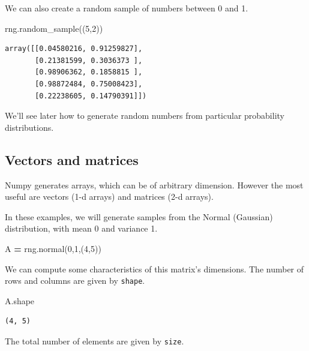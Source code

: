 \documentclass[
  letterpaper,
]{scrbook}
\newenvironment{Shaded}{\begin{snugshade}}{\end{snugshade}}
\newcommand{\DecValTok}[1]{\textcolor[rgb]{0.00,0.00,0.81}{#1}}
\newcommand{\NormalTok}[1]{#1}
\newcommand{\OperatorTok}[1]{\textcolor[rgb]{0.81,0.36,0.00}{\textbf{#1}}}
\begin{document}
We can also create a random sample of numbers between 0 and 1.

\begin{Shaded}
\begin{Highlighting}[]
\NormalTok{rng.random_sample((}\DecValTok{5}\NormalTok{,}\DecValTok{2}\NormalTok{))}
\end{Highlighting}
\end{Shaded}

\begin{verbatim}
array([[0.04580216, 0.91259827],
       [0.21381599, 0.3036373 ],
       [0.98906362, 0.1858815 ],
       [0.98872484, 0.75008423],
       [0.22238605, 0.14790391]])
\end{verbatim}

We'll see later how to generate random numbers from particular probability distributions.

\hypertarget{vectors-and-matrices}{%
\subsection{Vectors and matrices}\label{vectors-and-matrices}}

Numpy generates arrays, which can be of arbitrary dimension. However the most useful are vectors (1-d arrays) and matrices (2-d arrays).

In these examples, we will generate samples from the Normal (Gaussian) distribution, with mean 0 and variance 1.

\begin{Shaded}
\begin{Highlighting}[]
\NormalTok{A }\OperatorTok{=}\NormalTok{ rng.normal(}\DecValTok{0}\NormalTok{,}\DecValTok{1}\NormalTok{,(}\DecValTok{4}\NormalTok{,}\DecValTok{5}\NormalTok{))}
\end{Highlighting}
\end{Shaded}

We can compute some characteristics of this matrix's dimensions. The number of rows and columns are given by \texttt{shape}.

\begin{Shaded}
\begin{Highlighting}[]
\NormalTok{A.shape}
\end{Highlighting}
\end{Shaded}

\begin{verbatim}
(4, 5)
\end{verbatim}

The total number of elements are given by \texttt{size}.
\end{document}
